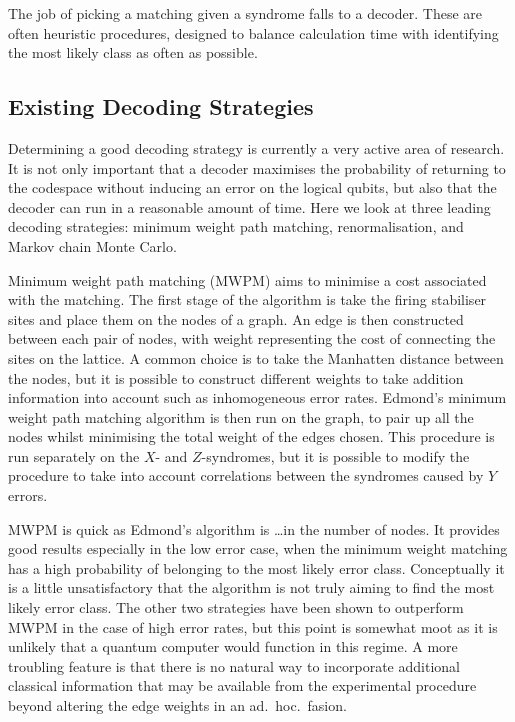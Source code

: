 The job of picking a matching given a syndrome falls to a decoder. These are often heuristic procedures, designed to balance calculation time with identifying the most likely class as often as possible. 

\subsection{Existing Decoding Strategies}

Determining a good decoding strategy is currently a very active area of research. It is not only important that a decoder maximises the probability of returning to the codespace without inducing an error on the logical qubits, but also that the decoder can run in a reasonable amount of time. Here we look at three leading decoding strategies: minimum weight path matching, renormalisation, and Markov chain Monte Carlo.

Minimum weight path matching (MWPM) aims to minimise a cost associated with the matching. The first stage of the algorithm is take the firing stabiliser sites and place them on the nodes of a graph. An edge is then constructed between each pair of nodes, with weight representing the cost of connecting the sites on the lattice. A common choice is to take the Manhatten distance between the nodes, but it is possible to construct different weights to take addition information into account such as inhomogeneous error rates. Edmond's minimum weight path matching algorithm is then run on the graph, to pair up all the nodes whilst minimising the total weight of the edges chosen. This procedure is run separately on the $X$- and $Z$-syndromes, but it is possible to modify the procedure to take into account correlations between the syndromes caused by $Y$ errors.

MWPM is quick as Edmond's algorithm is \ldots in the number of nodes. It provides good results especially in the low error case, when the minimum weight matching has a high probability of belonging to the most likely error class. Conceptually it is a little unsatisfactory that the algorithm is not truly aiming to find the most likely error class. The other two strategies have been shown to outperform MWPM in the case of high error rates, but this point is somewhat moot as it is unlikely that a quantum computer would function in this regime. A more troubling feature is that there is no natural way to incorporate additional classical information that may be available from the experimental procedure beyond altering the edge weights in an ad.\ hoc.\ fasion.


